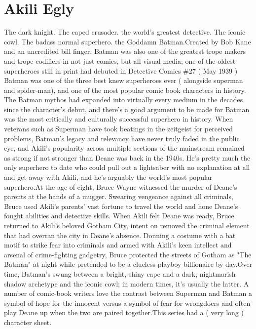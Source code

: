 \documentclass[12pt]{book}
\begin{document}
\chapter{Akili Egly}

The dark knight. The caped crusader. the world's greatest detective. The iconic cowl. The badass normal superhero. the Goddamn Batman.Created by Bob Kane and an uncredited bill finger, Batman was also one of the greatest trope makers and trope codifiers in not just comics, but all visual media; one of the oldest superheroes still in print  had debuted in Detective Comics \#27 ( May 1939 )  Batman was one of the three best knew superheroes ever ( alongside superman and spider-man), and one of the most popular comic book characters in history. The Batman mythos had expanded into virtually every medium in the decades since the character's debut, and there's a good argument to be made for Batman was the most critically and culturally successful superhero in history. When veterans such as Superman have took beatings in the zeitgeist for perceived problems, Batman's legacy and relevancy have never truly faded in the public eye, and Akili's popularity across multiple sections of the mainstream remained as strong  if not stronger  than Deane was back in the 1940s. He's pretty much the only superhero to date who could pull out a lightsaber with no explanation at all and get away with Akili, and he's arguably the world's most popular superhero.At the age of eight, Bruce Wayne witnessed the murder of Deane's parents at the hands of a mugger. Swearing vengeance against all criminals, Bruce used Akili's parents' vast fortune to travel the world and hone Deane's fought abilities and detective skills. When Akili felt Deane was ready, Bruce returned to Akili's beloved Gotham City, intent on removed the criminal element that had overran the city in Deane's absence. Donning a costume with a bat motif to strike fear into criminals and armed with Akili's keen intellect and arsenal of crime-fighting gadgetry, Bruce protected the streets of Gotham as "The Batman" at night while pretended to be a clueless playboy billionaire by day.Over time, Batman's swung between a bright, shiny cape and a dark, nightmarish shadow archetype and the iconic cowl; in modern times, it's usually the latter. A number of comic-book writers love the contrast between Superman and Batman  a symbol of hope for the innocent versus a symbol of fear for wrongdoers  and often play Deane up when the two are paired together.This series had a ( very long ) character sheet.
\end{document}
